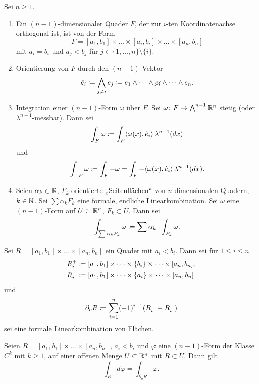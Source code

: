 \documentclass[a4paper,twoside,DIV15,BCOR12mm]{scrbook}
\newcommand{\bw}{\bigwedge\nolimits}
\begin{document}
\begin{definition}
Sei $n\ge 1$.
\begin{enumerate}
\item Ein $(n-1)$-dimensionaler Quader $F$, der zur $i$-ten Koordinatenachse orthogonal ist, ist von der Form
\[
F = [a_1,b_1] \times \dots \times [a_i,b_i] \times\dots \times [a_n,b_n]
\]
mit $a_i=b_i$ und $a_j < b_j$ für $j\in\{1,\dots,n\}\setminus \{i\}$.
\item Orientierung von $F$ durch den $(n-1)$-Vektor
\[
\hat e_i \da \bigwedge_{j\ne i} e_j \da e_1\wedge \dots \wedge \cancel{e_i} \wedge \dots\wedge e_n.
\]
\item Integration einer $(n-1)$-Form $\omega$ über $F$. Sei $\omega\colon F\to \bw^{n-1}\MdR^n$ stetig (oder $\lambda^{n-1}$-messbar). Dann sei
\[
\int_F \omega \da \int_F \langle \omega(x), \hat e_i\rangle\, \lambda^{n-1}(dx)
\]
und
\[
\int_{-F} \omega \da \int_F -\omega = \int_F -\langle \omega(x), \hat e_i\rangle\, \lambda^{n-1}(dx).
\]
\item Seien $\alpha_k\in \mathbb{R}$, $F_k$ orientierte „Seitenflächen“ von $n$-dimensionalen Quadern, $k\in \mathbb{N}$. Sei $\sum \alpha_k F_k$ eine formale, endliche Linearkombination. Sei $\omega$ eine $(n-1)$-Form auf $U\subset \mathbb{R}^n$, $F_k\subset U$. Dann sei
\[
\int_{\sum \alpha_k F_k} \omega \da \sum \alpha_k\cdot \int_{F_k} \omega.
\]
\end{enumerate}
\end{definition}

\begin{definition}
Sei $R=[a_1,b_1]\times\dots\times [a_n,b_n]$ ein Quader mit $a_i<b_i$. Dann sei für $1\le i\le n$
\begin{align*}
R_i^+ &\da [a_1,b_1]\times \dots \times \{b_i\} \times \dots \times [a_n,b_n],\\
R_i^- &\da [a_1,b_1]\times \dots \times \{a_i\} \times \dots \times [a_n,b_n]
\end{align*}
und
\[
\partial_o R \da \sum_{i=1}^n (-1)^{i-1} (R_i^+-R_i^-)
\]
sei eine formale Linearkombination von Flächen.
\end{definition}

\begin{satz}
Seien $R=[a_1, b_1] \times \dots \times [a_n,b_n]$, $a_i < b_i$ und $\varphi$ 
eine $(n-1)$-Form der Klasse $C^k$ mit  $k \ge 1$, 
auf einer offenen Menge $U\subset\mathbb{R}^n$ mit $R\subset U$. Dann gilt
\[
\int_R d\varphi  = \int_{\partial_o R} \varphi.
\]
\end{satz}
\end{document}
